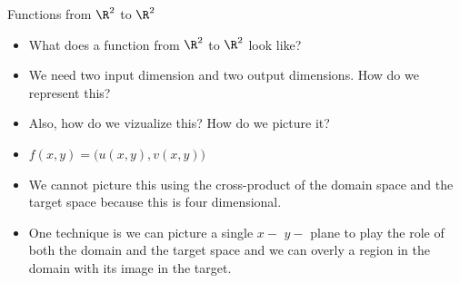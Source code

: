 \documentclass{beamer}
\begin{document}
\begin{frame}{Functions from $\R^2$ to $\R^2$}
\begin{itemize}
\item What does a function from $\R^2$ to $\R^2$ look like?
\item We need two input dimension and two output dimensions.
How do we represent this?
\item Also, how do we vizualize this? How do we picture it?
\item $f(x,y) = \big( u(x,y), v(x,y) \big)$
\item We cannot picture this using the cross-product of the domain space
and the target space because this is four dimensional.
\item One technique is we can picture a single $x-$ $y-$ plane to play
the role of both the domain and the target space and we can overly
a region in the domain with its image in the target.
\end{itemize}
\end{frame}
\end{document}
